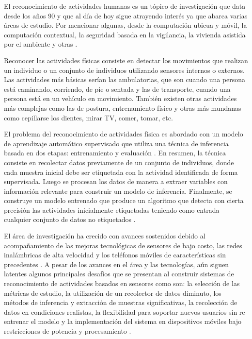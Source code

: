 \label{planteamiento}

El reconocimiento de actividades humanas es un tópico de investigación
que data desde los años 90 y que al día de hoy sigue atrayendo interés
ya que abarca varias áreas de estudio. Por mencionar algunas, desde
la computación ubicua y móvil, la computación contextual, la seguridad
basada en la vigilancia, la vivienda asistida por el ambiente y otras
\cite{chen2012sensor}. 

Reconocer las actividades físicas consiste en detectar los movimientos
que realizan un individuo o un conjunto de individuos utilizando sensores
internos o externos. Las actividades más básicas serían las ambulatorias,
que son cuando una persona está caminando, corriendo, de pie o sentada
y las de transporte, cuando una persona está en un vehículo en movimiento.
También existen otras actividades más complejas como las de postura,
entrenamiento físico y otras más mundanas como cepillarse los dientes,
mirar TV, comer, tomar, etc. \cite{LaraLabrador2013}

El problema del reconocimiento de actividades física es abordado con
un modelo de aprendizaje automático supervisado que utiliza una técnica
de inferencia basada en dos etapas: entrenamiento y evaluación \cite{LaraLabrador2013}
\cite{Kwapisz2011}. En resumen, la técnica consiste en recolectar
datos previamente de un conjunto de individuos, donde cada muestra
inicial debe ser etiquetada con la actividad identificada de forma
supervisada. Luego se procesan los datos de manera a extraer variables
con información relevante para construir un modelo de inferencia.
Finalmente, se construye un modelo entrenado que produce un algoritmo
que detecta con cierta precisión las actividades inicialmente etiquetadas
teniendo como entrada cualquier conjunto de datos no etiquetados \cite{Bao2004}.

El área de investigación ha crecido con avances sostenidos debido
al acompañamiento de las mejoras tecnológicas de sensores de bajo
costo, las redes inalámbricas de alta velocidad y los teléfonos móviles
de características sin precedentes \cite{chen2012sensor}. A pesar
de los avances en el área y las tecnologías, aún siguen latentes algunos
principales desafíos que se presentan al construir sistemas de reconocimiento
de actividades basados en sensores como son: la selección de las métricas
de estudio, la utilización de un recolector de datos diminuto, los
métodos de inferencia y extracción de muestras significativas, la
recolección de datos en condiciones realistas, la flexibilidad para
soportar nuevos usuarios sin re-entrenar el modelo y la implementación
del sistema en dispositivos móviles bajo restricciones de potencia
y procesamiento \cite{LaraLabrador2013}. 

